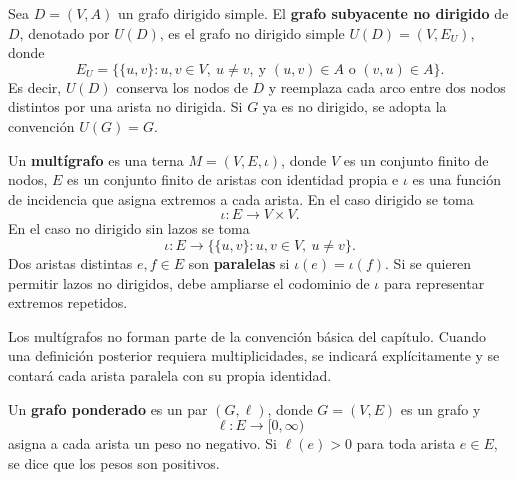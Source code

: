         \begin{definicion}
            Sea $D=(V,A)$ un grafo dirigido simple. El \textbf{grafo subyacente no dirigido} de $D$, denotado por $U(D)$, es el grafo no dirigido simple $U(D)=(V,E_U)$, donde
            \[
                E_U=\{\{u,v\}: u,v\in V,\ u\neq v,\ \text{y }(u,v)\in A\text{ o }(v,u)\in A\}.
            \]
            Es decir, $U(D)$ conserva los nodos de $D$ y reemplaza cada arco entre dos nodos distintos por una arista no dirigida. Si $G$ ya es no dirigido, se adopta la convención $U(G)=G$.
        \end{definicion}

        \begin{definicion}[Multígrafo]
            Un \textbf{multígrafo} es una terna $M=(V,E,\iota)$, donde $V$ es un conjunto finito de nodos, $E$ es un conjunto finito de aristas con identidad propia e $\iota$ es una función de incidencia que asigna extremos a cada arista. En el caso dirigido se toma
            \[
                \iota:E\to V\times V.
            \]
            En el caso no dirigido sin lazos se toma
            \[
                \iota:E\to \{\{u,v\}:u,v\in V,\ u\neq v\}.
            \]
            Dos aristas distintas $e,f\in E$ son \textbf{paralelas} si $\iota(e)=\iota(f)$. Si se quieren permitir lazos no dirigidos, debe ampliarse el codominio de $\iota$ para representar extremos repetidos.
        \end{definicion}

        \begin{observacion}
            Los multígrafos no forman parte de la convención básica del capítulo. Cuando una definición posterior requiera multiplicidades, se indicará explícitamente y se contará cada arista paralela con su propia identidad.
        \end{observacion}

        \begin{definicion}
            Un \textbf{grafo ponderado} es un par $(G,\ell)$, donde $G=(V,E)$ es un grafo y
            \[
                \ell:E\to[0,\infty)
            \]
            asigna a cada arista un peso no negativo. Si $\ell(e)>0$ para toda arista $e\in E$, se dice que los pesos son positivos.
        \end{definicion}

